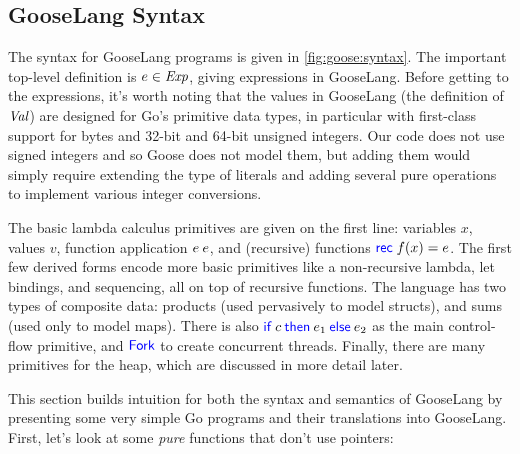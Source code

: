 \subsection{GooseLang Syntax}%
\label{sec:goose:syntax}



The syntax for GooseLang programs is given in \cref{fig:goose:syntax}. The
important top-level definition is $e \in \textit{Exp}$, giving expressions in
GooseLang. Before getting to the expressions, it's worth noting that the values
in GooseLang (the definition of $\textit{Val}$) are designed for Go's primitive data types, in particular with
first-class support for bytes and 32-bit and 64-bit unsigned integers. Our code does
not use signed integers and so Goose does not model them, but adding them would simply
require extending the type of literals and adding several pure operations to
implement various integer conversions.

The basic lambda calculus primitives are given on the first line: variables $x$,
values $v$, function application $e \: e$, and (recursive) functions $\mbox{\ensuremath{\mathsf{\textcolor{blue}{rec}}}\;$f(x) = e$}$.
The first few derived forms encode more basic primitives like a non-recursive
lambda, let bindings, and sequencing, all on top of recursive functions. The
language has two types of composite data: products (used pervasively to model
structs), and sums (used only to model maps). There is also $\mathsf{\textcolor{blue}{if}} \: c \: \mathsf{\textcolor{blue}{then}} \: e_{1} \: \mathsf{\textcolor{blue}{else}} \: e_{2}$ as the
main control-flow primitive, and $\mathsf{\textcolor{blue}{Fork}}$ to create concurrent threads.
Finally, there are many primitives for the heap, which are discussed in more
detail later.

This section builds intuition for both the syntax and semantics of GooseLang by presenting
some very simple Go programs and their translations into GooseLang. First,
let's look at some \emph{pure} functions that don't use pointers:

\newcommand{\translaterule}{\rule{0.9\textwidth}{0.5pt}}

\newenvironment{translatego}{
  \noindent
  \translaterule \\[-10pt]
  \begin{minipage}[t]{0.5\textwidth}
  \strut\vspace*{-\baselineskip}
  \setminted[go]{frame=none}
}{
  \end{minipage}
  \setminted[go]{frame=lines}
}

